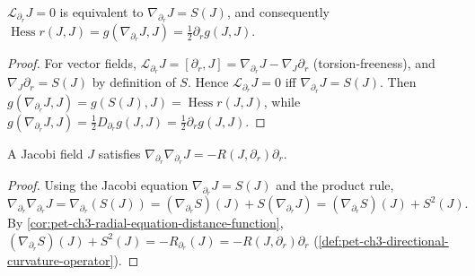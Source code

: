 \begin{lemma}
  \label{lem:pet-ch3-jacobi-field-equivalent-equation}
  \leanok
  $\mathcal L_{\partial_r}J=0$ is equivalent to $\nabla_{\partial_r}J=S(J)$, and
  consequently $\operatorname{Hess}r(J,J)=g(\nabla_{\partial_r}J,J)=\tfrac12\partial_rg(J,J)$.
\end{lemma}
\begin{proof}
  \leanok
  For vector fields, $\mathcal L_{\partial_r}J=[\partial_r,J]=\nabla_{\partial_r}J-\nabla_J\partial_r$
  (torsion-freeness), and $\nabla_J\partial_r=S(J)$ by definition of $S$. Hence
  $\mathcal L_{\partial_r}J=0$ iff $\nabla_{\partial_r}J=S(J)$. Then $g(\nabla_{\partial_r}J,J)=g(S(J),J)=\operatorname{Hess}r(J,J)$,
  while $g(\nabla_{\partial_r}J,J)=\tfrac12D_{\partial_r}g(J,J)=\tfrac12\partial_rg(J,J)$.
\end{proof}

\begin{proposition}
  \label{prop:pet-ch3-jacobi-second-order-equation}
  \leanok
  A Jacobi field $J$ satisfies $\nabla_{\partial_r}\nabla_{\partial_r}J=-R(J,\partial_r)\partial_r$.
\end{proposition}
\begin{proof}
  \leanok
  Using the Jacobi equation $\nabla_{\partial_r}J=S(J)$ and the product rule,
  \[
    \nabla_{\partial_r}\nabla_{\partial_r}J=\nabla_{\partial_r}(S(J))
    =(\nabla_{\partial_r}S)(J)+S(\nabla_{\partial_r}J)=(\nabla_{\partial_r}S)(J)+S^2(J).
  \]
  By \cref{cor:pet-ch3-radial-equation-distance-function},
  $(\nabla_{\partial_r}S)(J)+S^2(J)=-R_{\partial_r}(J)=-R(J,\partial_r)\partial_r$
  (\cref{def:pet-ch3-directional-curvature-operator}).
\end{proof}

